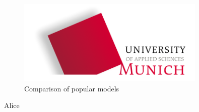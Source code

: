 \begin{figure}[htbp]
\includegraphics[width=0.8\textwidth]{includes/MUASlogo}
\caption[Comparison of popular models]{Comparison of popular models \citep{TensorFlowMobileNet}}
\label{fig:FH-Logo8}
\end{figure} 

	 Alice
